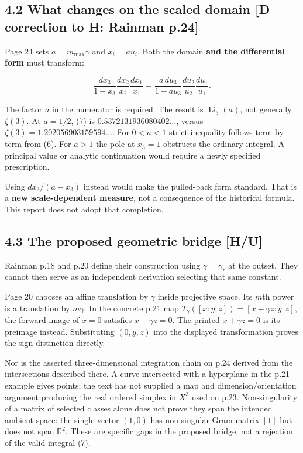 \documentclass[11pt,a4paper]{article}
\begin{document}
\subsection*{4.2 What changes on the scaled domain [D correction to H: Rainman p.24]}

Page 24 sets $a=m_{\max}\gamma$ and $x_i=a u_i$. Both the domain \textbf{and the differential form} must transform:


\[
\frac{dx_3}{1-x_3}\frac{dx_2}{x_2}\frac{dx_1}{x_1}
=\frac{a\,du_3}{1-a u_3}\frac{du_2}{u_2}\frac{du_1}{u_1}. \tag{8}
\]

The factor $a$ in the numerator is required. The result is $\operatorname{Li}_3(a)$, not generally $\zeta(3)$. At $a=1/2$, (7) is $0.5372131936080402\ldots$, versus $\zeta(3)=1.202056903159594\ldots$. For $0<a<1$ strict inequality follows term by term from (6). For $a>1$ the pole at $x_3=1$ obstructs the ordinary integral. A principal value or analytic continuation would require a newly specified prescription.


Using $dx_3/(a-x_3)$ instead would make the pulled-back form standard. That is a \textbf{new scale-dependent measure}, not a consequence of the historical formula. This report does not adopt that completion.


\subsection*{4.3 The proposed geometric bridge [H/U]}

Rainman p.18 and p.20 define their construction using $\gamma=\gamma_*$ at the outset. They cannot then serve as an independent derivation selecting that same constant.


Page 20 chooses an affine translation by $\gamma$ inside projective space. Its $m$th power is a translation by $m\gamma$. In the concrete p.21 map
$T_\gamma([x:y:z])=[x+\gamma z:y:z]$, the forward image of $x=0$ satisfies $x-\gamma z=0$. The printed $x+\gamma z=0$ is its preimage instead. Substituting $(0,y,z)$ into the displayed transformation proves the sign distinction directly.


Nor is the asserted three-dimensional integration chain on p.24 derived from the intersections described there. A curve intersected with a hyperplane in the p.21 example gives points; the text has not supplied a map and dimension/orientation argument producing the real ordered simplex in $X^3$ used on p.23. Non-singularity of a matrix of selected classes alone does not prove they span the intended ambient space: the single vector $(1,0)$ has non-singular Gram matrix $[1]$ but does not span $\mathbb R^2$. These are specific gaps in the proposed bridge, not a rejection of the valid integral (7).
\end{document}
